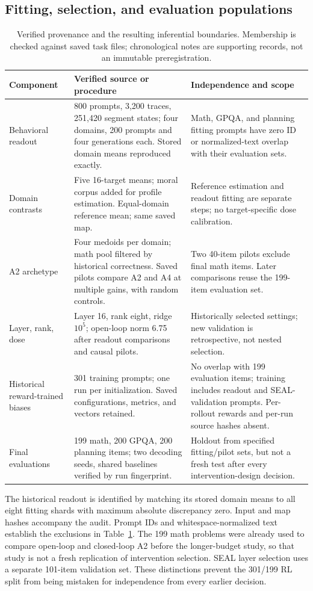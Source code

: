 \subsection{Fitting, selection, and evaluation populations}
\begin{table}[t]
\centering\small
\begin{tabularx}{\textwidth}{@{}lXX@{}}
\toprule Component & Verified source or procedure & Independence and scope\\\midrule
Behavioral readout & 800 prompts, 3,200 traces, 251,420 segment states; four domains, 200 prompts and four generations each. Stored domain means reproduced exactly. & Math, GPQA, and planning fitting prompts have zero ID or normalized-text overlap with their evaluation sets.\\
Domain contrasts & Five 16-target means; moral corpus added for profile estimation. Equal-domain reference mean; same saved map. & Reference estimation and readout fitting are separate steps; no target-specific dose calibration.\\
A2 archetype & Four medoids per domain; math pool filtered by historical correctness. Saved pilots compare A2 and A4 at multiple gains, with random controls. & Two 40-item pilots exclude final math items. Later comparisons reuse the 199-item evaluation set.\\
Layer, rank, dose & Layer 16, rank eight, ridge $10^5$; open-loop norm 6.75 after readout comparisons and causal pilots. & Historically selected settings; new validation is retrospective, not nested selection.\\
Historical reward-trained biases & 301 training prompts; one run per initialization. Saved configurations, metrics, and vectors retained. & No overlap with 199 evaluation items; training includes readout and SEAL-validation prompts. Per-rollout rewards and per-run source hashes absent.\\
Final evaluations & 199 math, 200 GPQA, 200 planning items; two decoding seeds, shared baselines verified by run fingerprint. & Holdout from specified fitting/pilot sets, but not a fresh test after every intervention-design decision.\\
\bottomrule
\end{tabularx}
\caption{Verified provenance and the resulting inferential boundaries. Membership is checked against saved task files; chronological notes are supporting records, not an immutable preregistration.}
\label{tab:provenance}
\end{table}
The historical readout is identified by matching its stored domain means to all eight fitting shards with maximum absolute discrepancy zero. Input and map hashes accompany the audit. Prompt IDs and whitespace-normalized text establish the exclusions in Table~\ref{tab:provenance}. The 199 math problems were already used to compare open-loop and closed-loop A2 before the longer-budget study, so that study is not a fresh replication of intervention selection. SEAL layer selection uses a separate 101-item validation set. These distinctions prevent the 301/199 RL split from being mistaken for independence from every earlier decision.

